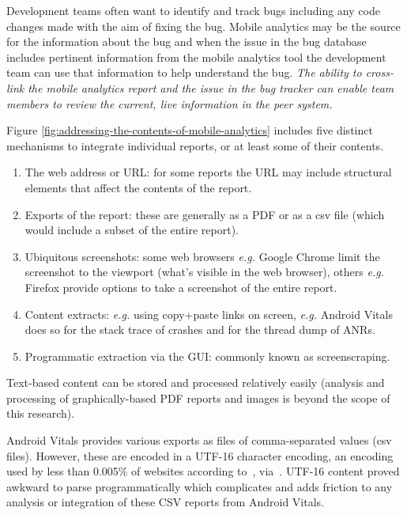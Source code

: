 Development teams often want to identify and track bugs including any code changes made with the aim of fixing the bug. Mobile analytics may be the source for the information about the bug and when the issue in the bug database includes pertinent information from the mobile analytics tool the development team can use that information to help understand the bug. \emph{The ability to cross-link the mobile analytics report and the issue in the bug tracker can enable team members to review the current, live information in the peer system.} 

Figure \ref{fig:addressing-the-contents-of-mobile-analytics} includes five distinct mechanisms to integrate individual reports, or at least some of their contents.
\begin{enumerate}
    \itemsep0em
    \item The web address or URL: for some reports the URL may include structural elements that affect the contents of the report.
    \item Exports of the report: these are generally as a PDF or as a \Gls{csv} file (which would include a subset of the entire report).
    \item Ubiquitous screenshots: some web browsers \emph{e.g.} Google Chrome limit the screenshot to the viewport (what's visible in the web browser), others \emph{e.g.} Firefox provide options to take a screenshot of the entire report.
    \item Content extracts: \emph{e.g.} using copy+paste links on screen, \emph{e.g.} Android Vitals does so for the stack trace of crashes and for the thread dump of ANRs.
    \item Programmatic extraction via the GUI: commonly known as screenscraping. 
\end{enumerate}

Text-based content can be stored and processed relatively easily (analysis and processing of graphically-based PDF reports and images is beyond the scope of this research). 

Android Vitals provides various exports as files of comma-separated values (\Gls{csv} files).  However, these are encoded in a UTF-16 character encoding, an encoding used by less than 0.005\% of websites according to~, via~. UTF-16 content proved awkward to parse programmatically which complicates and adds friction to any analysis or integration of these CSV reports from Android Vitals.

